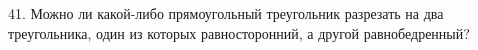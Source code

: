 41. Можно ли какой-либо прямоугольный треугольник разрезать на два треугольника, один из которых равносторонний, а другой равнобедренный?\\
